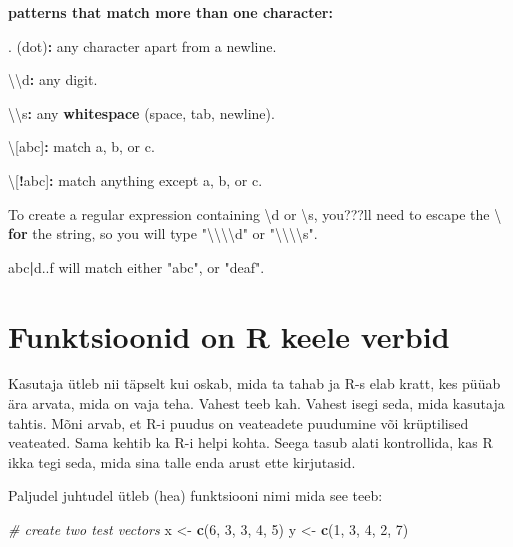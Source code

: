 \documentclass[]{book}
\newenvironment{Shaded}{\begin{snugshade}}{\end{snugshade}}
\newcommand{\KeywordTok}[1]{\textcolor[rgb]{0.13,0.29,0.53}{\textbf{#1}}}
\newcommand{\DecValTok}[1]{\textcolor[rgb]{0.00,0.00,0.81}{#1}}
\newcommand{\CharTok}[1]{\textcolor[rgb]{0.31,0.60,0.02}{#1}}
\newcommand{\StringTok}[1]{\textcolor[rgb]{0.31,0.60,0.02}{#1}}
\newcommand{\CommentTok}[1]{\textcolor[rgb]{0.56,0.35,0.01}{\textit{#1}}}
\newcommand{\ControlFlowTok}[1]{\textcolor[rgb]{0.13,0.29,0.53}{\textbf{#1}}}
\newcommand{\OperatorTok}[1]{\textcolor[rgb]{0.81,0.36,0.00}{\textbf{#1}}}
\newcommand{\NormalTok}[1]{#1}
\begin{document}
\textbf{patterns that match more than one character:}

\begin{Shaded}
\begin{Highlighting}[]
\NormalTok{. (dot)}\OperatorTok{:}\StringTok{ }\NormalTok{any character apart from a newline.}

\NormalTok{\textbackslash{}\textbackslash{}d}\OperatorTok{:}\StringTok{ }\NormalTok{any digit.}

\NormalTok{\textbackslash{}\textbackslash{}s}\OperatorTok{:}\StringTok{ }\NormalTok{any }\KeywordTok{whitespace}\NormalTok{ (space, tab, newline).}

\NormalTok{\textbackslash{}[abc]}\OperatorTok{:}\StringTok{ }\NormalTok{match a, b, or c.}

\NormalTok{\textbackslash{}[}\OperatorTok{!}\NormalTok{abc]}\OperatorTok{:}\StringTok{ }\NormalTok{match anything except a, b, or c.}

\NormalTok{To create a regular expression containing \textbackslash{}d or \textbackslash{}s, you???ll need to escape the \textbackslash{} }\ControlFlowTok{for}\NormalTok{ the string, so you will type }\StringTok{"}\CharTok{\textbackslash{}\textbackslash{}\textbackslash{}\textbackslash{}}\StringTok{d"}\NormalTok{ or }\StringTok{"}\CharTok{\textbackslash{}\textbackslash{}\textbackslash{}\textbackslash{}}\StringTok{s"}\NormalTok{.}

\NormalTok{abc}\OperatorTok{|}\NormalTok{d..f will match either }\StringTok{"abc"}\NormalTok{, or }\StringTok{"deaf"}\NormalTok{. }
\end{Highlighting}
\end{Shaded}

\chapter{Funktsioonid on R keele verbid}\label{funs}

Kasutaja ütleb nii täpselt kui oskab, mida ta tahab ja R-s elab kratt,
kes püüab ära arvata, mida on vaja teha. Vahest teeb kah. Vahest isegi
seda, mida kasutaja tahtis. Mõni arvab, et R-i puudus on veateadete
puudumine või krüptilised veateated. Sama kehtib ka R-i helpi kohta.
Seega tasub alati kontrollida, kas R ikka tegi seda, mida sina talle
enda arust ette kirjutasid.

Paljudel juhtudel ütleb (hea) funktsiooni nimi mida see teeb:

\begin{Shaded}
\begin{Highlighting}[]
\CommentTok{# create two test vectors}
\NormalTok{x <-}\StringTok{ }\KeywordTok{c}\NormalTok{(}\DecValTok{6}\NormalTok{, }\DecValTok{3}\NormalTok{, }\DecValTok{3}\NormalTok{, }\DecValTok{4}\NormalTok{, }\DecValTok{5}\NormalTok{)}
\NormalTok{y <-}\StringTok{ }\KeywordTok{c}\NormalTok{(}\DecValTok{1}\NormalTok{, }\DecValTok{3}\NormalTok{, }\DecValTok{4}\NormalTok{, }\DecValTok{2}\NormalTok{, }\DecValTok{7}\NormalTok{)}
\end{Highlighting}
\end{Shaded}
\end{document}
